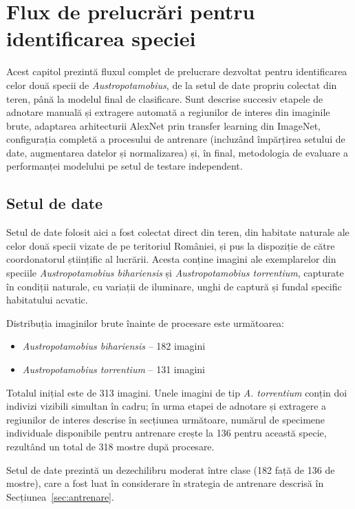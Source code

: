 \chapter{Flux de prelucrări pentru identificarea speciei}\label{chapter:cap4}

Acest capitol prezintă fluxul complet de prelucrare dezvoltat pentru identificarea celor două specii de \textit{Austropotamobius}, de la setul de date propriu colectat din teren, până la modelul final de clasificare. Sunt descrise succesiv etapele de adnotare manuală și extragere automată a regiunilor de interes din imaginile brute, adaptarea arhitecturii AlexNet prin transfer learning din ImageNet, configurația completă a procesului de antrenare (incluzând împărțirea setului de date, augmentarea datelor și normalizarea) și, în final, metodologia de evaluare a performanței modelului pe setul de testare independent.

\section{Setul de date}

Setul de date folosit aici a fost colectat direct din teren, din habitate naturale ale celor două specii vizate de pe teritoriul României, și pus la dispoziție de către coordonatorul științific al lucrării. Acesta conține imagini ale exemplarelor din speciile \textit{Austropotamobius bihariensis} și \textit{Austropotamobius torrentium}, capturate în condiții naturale, cu variații de iluminare, unghi de captură și fundal specific habitatului acvatic.

Distribuția imaginilor brute înainte de procesare este următoarea:
\begin{itemize}
    \item \textit{Austropotamobius bihariensis} -- 182 imagini
    \item \textit{Austropotamobius torrentium} -- 131 imagini
\end{itemize}

Totalul inițial este de 313 imagini. Unele imagini de tip \textit{A. torrentium} conțin doi indivizi vizibili simultan în cadru; în urma etapei de adnotare și extragere a regiunilor de interes descrise în secțiunea următoare, numărul de specimene individuale disponibile pentru antrenare crește la 136 pentru această specie, rezultând un total de 318 mostre după procesare.

Setul de date prezintă un dezechilibru moderat între clase (182 față de 136 de mostre), care a fost luat în considerare în strategia de antrenare descrisă în Secțiunea~\ref{sec:antrenare}.







